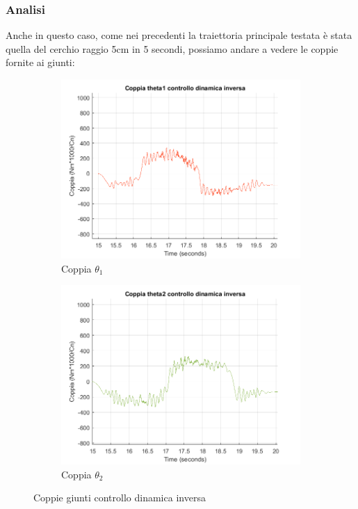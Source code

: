 \subsubsection*{Analisi}
Anche in questo caso, come nei precedenti la traiettoria principale testata è stata quella del cerchio raggio 5cm in 5 secondi, possiamo andare a vedere le coppie fornite ai giunti:
\begin{figure}
\begin{subfigure}{.53\textwidth}
  \includegraphics[width=.8\linewidth]{Immagini/Traiettorie/CoppiaT1ID}  
  \caption{Coppia $\theta_1$}
  \label{fig:sub-ikd1}
\end{subfigure}
\begin{subfigure}{.53\textwidth}
  \includegraphics[width=.8\linewidth]{Immagini/Traiettorie/CoppiaT2ID}  
  \caption{Coppia $\theta_2$}
  \label{fig:sub-ikd2}
\end{subfigure}
\caption{Coppie giunti controllo dinamica inversa}
\label{fig:CoppieID}
\end{figure}
